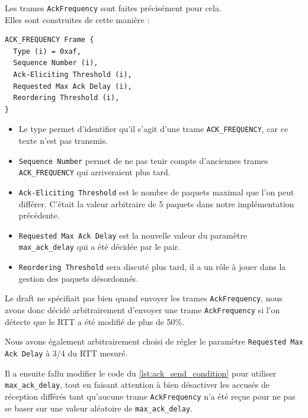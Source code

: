 \vspace{0.5cm}

Les trames \verb|AckFrequency| sont faites précisément pour cela.\\
Elles sont construites de cette manière :

\begin{center}
    \begin{lstlisting}
ACK_FREQUENCY Frame {
  Type (i) = 0xaf,
  Sequence Number (i),
  Ack-Eliciting Threshold (i),
  Requested Max Ack Delay (i),
  Reordering Threshold (i),
}
    \end{lstlisting}
\end{center}

\begin{itemize}
\item Le type permet d'identifier qu'il s'agit d'une trame \verb|ACK_FREQUENCY|, car ce texte n'est pas transmis.
\item \verb|Sequence Number| permet de ne pas tenir compte d'anciennes trames \verb|ACK_FREQUENCY| qui arriveraient plus tard.
\item \verb|Ack-Eliciting Threshold| est le nombre de paquets maximal que l'on peut différer. C'était la valeur arbitraire de 5 paquets dans notre implémentation précédente.
\item \verb|Requested Max Ack Delay| est la nouvelle valeur du paramètre \verb|max_ack_delay| qui a été décidée par le pair.
\item \verb|Reordering Threshold| sera discuté plus tard, il a un rôle à jouer dans la gestion des paquets désordonnés.
\end{itemize}

\vspace{1cm}

Le draft ne spécifiait pas bien quand envoyer les trames \verb|AckFrequency|, nous avons donc décidé arbitrairement d'envoyer une trame \verb|AckFrequency| si l'on détecte que le RTT a été modifié de plus de 50\%.

Nous avons également arbitrairement choisi de régler le paramètre \texttt{Requested Max Ack Delay} à 3/4 du RTT mesuré.

\vspace{0.5cm}

Il a ensuite fallu modifier le code du \autoref{lst:ack_send_condition} pour utiliser \verb|max_ack_delay|, tout en faisant attention à bien désactiver les accusés de réception différés tant qu'aucune trame \verb|AckFrequency| n'a été reçue pour ne pas se baser sur une valeur aléatoire de \verb|max_ack_delay|.

